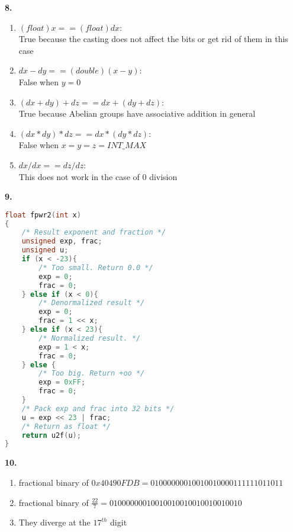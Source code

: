 \documentclass[11pt]{article} %
\begin{document}
\vspace{0.5in}
{\bf 8.}
\begin{enumerate}[label=\alph*)]
\item $(float) x == (float) dx$: \\
True because the casting does not affect the bits or get rid of them in this case

\item $dx - dy == (double) (x - y)$: \\
False when $y = 0$

\item $(dx + dy) + dz == dx + (dy + dz)$: \\
True because Abelian groups have associative addition in general

\item $(dx * dy) * dz == dx * (dy * dz)$: \\
False when $x = y = z = INT\_MAX$

\item $dx / dx == dz / dz$: \\
This does not work in the case of $0$ division
\end{enumerate}


\vspace{0.5in}
{\bf 9.}
\begin{lstlisting}[language=C]
float fpwr2(int x)
{
	/* Result exponent and fraction */
	unsigned exp, frac;
	unsigned u;
	if (x < -23){
		/* Too small. Return 0.0 */
		exp = 0;
		frac = 0;
	} else if (x < 0){
		/* Denormalized result */
		exp = 0;
		frac = 1 << x;
	} else if (x < 23){
		/* Normalized result. */
		exp = 1 < x;
		frac = 0;
	} else {
		/* Too big. Return +oo */
		exp = 0xFF;
		frac = 0;
	}
	/* Pack exp and frac into 32 bits */
	u = exp << 23 | frac;
	/* Return as float */
	return u2f(u);
}
\end{lstlisting}

\vspace{0.5in}
{\bf 10.}
\begin{enumerate}[label=\alph*)]
\item fractional binary of $0x40490FDB = 01000000010010010000111111011011$
\item fractional binary of $\frac{22}{7} = 01000000010010010010010010010010$
\item They diverge at the $17^{th}$ digit
\end{enumerate}
\end{document}
